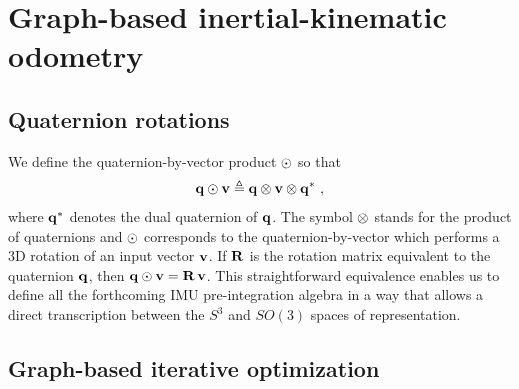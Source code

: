 
\section{Graph-based inertial-kinematic odometry}




\subsection{Quaternion rotations}

We define the quaternion-by-vector product $\odot$ so that
%
\begin{align}
{\bf q}\odot{\bf v} \triangleq {\bf q}\otimes{\bf v}\otimes{\bf q}^*
~,
\end{align}
%
where ${\bf q}^*$ denotes the dual quaternion of ${\bf q}$. 
The symbol $\otimes$ stands for the product of quaternions and $\odot$ corresponds to the quaternion-by-vector which performs a 3D rotation of an input vector ${\bf v}$. 
If ${\bf R}$ is the rotation matrix equivalent to the quaternion ${\bf q}$, then 
%
${\bf q}\odot{\bf v} = {\bf R}\,{\bf v}$. 
%
This straightforward equivalence
enables us to define all the forthcoming IMU pre-integration algebra in a way that allows a direct transcription between the $S^3$  and $SO(3)$ spaces of representation.

\subsection{Graph-based iterative optimization}

